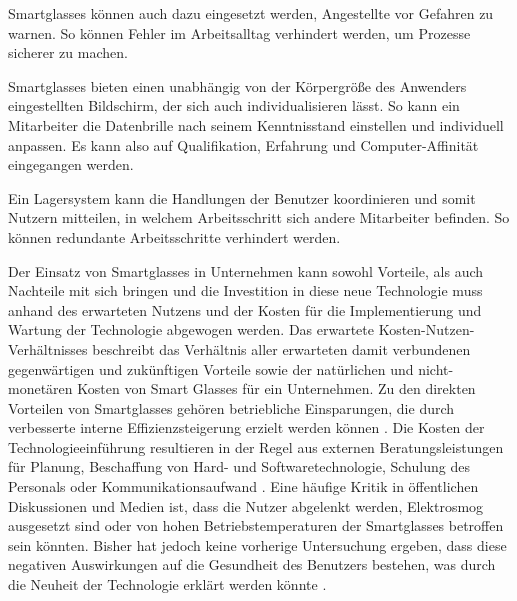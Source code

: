 Smartglasses können auch dazu eingesetzt werden, Angestellte vor Gefahren zu warnen. So können Fehler im Arbeitsalltag verhindert werden, um Prozesse sicherer zu machen. 

Smartglasses bieten einen unabhängig von der Körpergröße des Anwenders eingestellten Bildschirm, der sich auch individualisieren lässt. So kann ein Mitarbeiter die Datenbrille nach seinem Kenntnisstand einstellen und individuell anpassen. Es kann also auf Qualifikation, Erfahrung und Computer-Affinität eingegangen werden.

Ein Lagersystem kann die Handlungen der Benutzer koordinieren und somit Nutzern mitteilen, in welchem Arbeitsschritt sich andere Mitarbeiter befinden. So können redundante Arbeitsschritte verhindert werden. 

Der Einsatz von Smartglasses in Unternehmen kann sowohl Vorteile, als auch Nachteile mit sich bringen und die Investition in diese neue Technologie muss anhand des erwarteten Nutzens und der Kosten für die Implementierung und Wartung der Technologie abgewogen werden. Das erwartete Kosten-Nutzen-Verhältnisses beschreibt das Verhältnis aller erwarteten damit verbundenen gegenwärtigen und zukünftigen Vorteile sowie der natürlichen und nicht-monetären Kosten von Smart Glasses für ein Unternehmen. Zu den direkten Vorteilen von Smartglasses gehören betriebliche Einsparungen, die durch verbesserte interne Effizienzsteigerung erzielt werden können \cite{Hein2016}.
Die Kosten der Technologieeinführung resultieren in der Regel aus externen Beratungsleistungen für Planung, Beschaffung von Hard- und Softwaretechnologie, Schulung des Personals oder Kommunikationsaufwand \cite{Hein2016}. Eine häufige Kritik in öffentlichen Diskussionen und Medien ist, dass die Nutzer abgelenkt werden, Elektrosmog ausgesetzt sind oder von hohen Betriebstemperaturen der Smartglasses betroffen sein könnten. Bisher hat jedoch keine vorherige Untersuchung ergeben, dass diese negativen Auswirkungen auf die Gesundheit des Benutzers bestehen, was durch die Neuheit der Technologie erklärt werden könnte \cite{Hein2016}.
%
%
%
%
%
